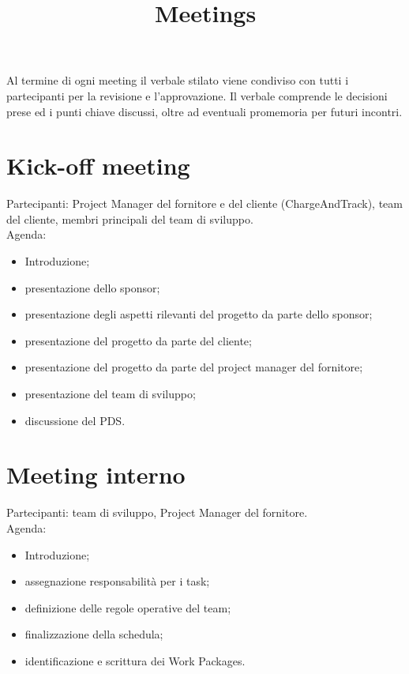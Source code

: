 \documentclass[a4paper,12pt]{article}
\title{\textbf{Meetings}}
\author{}
\date{}
\begin{document}
\maketitle
\tableofcontents

\newpage

Al termine di ogni meeting il verbale stilato viene condiviso con tutti i partecipanti per la revisione e
l'approvazione. Il verbale comprende le decisioni prese ed i punti chiave discussi, oltre ad eventuali
promemoria per futuri incontri.

\section{Kick-off meeting}
Partecipanti: Project Manager del fornitore e del cliente (ChargeAndTrack), team del cliente, membri principali del
team di sviluppo.\\

Agenda:
\begin{itemize}
    \item Introduzione;
    \item presentazione dello sponsor;
    \item presentazione degli aspetti rilevanti del progetto da parte dello sponsor;
    \item presentazione del progetto da parte del cliente;
    \item presentazione del progetto da parte del project manager del fornitore;
    \item presentazione del team di sviluppo;
    \item discussione del PDS.
\end{itemize}

\section{Meeting interno}
Partecipanti: team di sviluppo, Project Manager del fornitore.\\

Agenda:
\begin{itemize}
    \item Introduzione;
    \item assegnazione responsabilità per i task;
    \item definizione delle regole operative del team;
    \item finalizzazione della schedula;
    \item identificazione e scrittura dei Work Packages.
\end{itemize}
\end{document}
